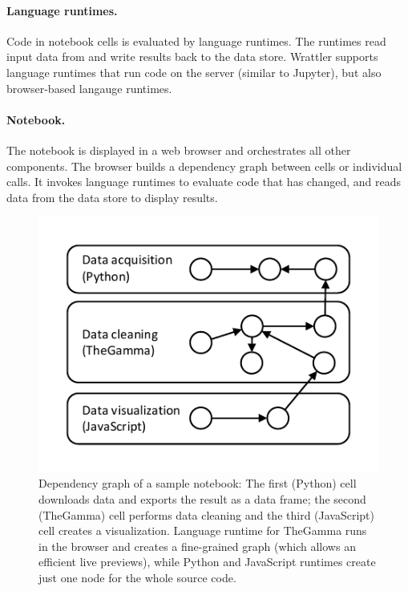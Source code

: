\documentclass[sigplan]{acmart}\settopmatter{printfolios=true,printccs=false,printacmref=false}
\begin{document}
\paragraph{Language runtimes.} Code in notebook cells is evaluated by language runtimes.
The runtimes read input data from and write results back to the data store. Wrattler supports
language runtimes that run code on the server (similar to Jupyter), but also browser-based 
langauge runtimes.

\paragraph{Notebook.} The notebook is displayed in a web browser and orchestrates 
all other components. The browser builds a dependency graph between cells or individual 
calls. It invokes language runtimes to evaluate code that has changed,
and reads data from the data store to display results.  


\begin{figure}
\vspace{-0.5em}
\includegraphics[scale=1,trim=0.5cm 0.5cm 0.5cm 0.5cm]{graph.pdf}
\vspace{-0.5em}
\caption{\small{Dependency graph of a sample notebook: The first (Python) cell downloads data and 
exports the result as a data frame; the second (TheGamma) cell performs data cleaning and the third 
(JavaScript) cell creates a visualization. Language runtime for TheGamma runs in the browser and 
creates a fine-grained graph (which allows an efficient live previews), while Python and JavaScript 
runtimes create just one node for the whole source code.}}
\label{fig:deps}
\vspace{-1em}
\end{figure}
\end{document}
